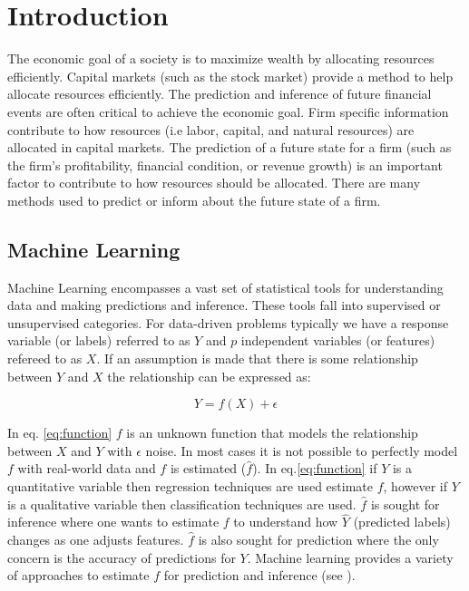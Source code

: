 \chapter{Introduction}


The economic goal of a society is to maximize wealth by allocating resources efficiently. Capital markets (such as the stock market) provide a method to help allocate resources efficiently. The prediction and inference of future financial events are often critical to achieve the economic goal. Firm specific information contribute to how resources (i.e labor, capital, and natural resources) are allocated in capital markets. The prediction of a future state for a firm (such as the firm's profitability, financial condition, or revenue growth) is an important factor to contribute to how resources should be allocated.  There are many methods used to predict or inform about the future state of a firm.  


\section{Machine Learning}

Machine Learning encompasses a vast set of statistical tools for understanding data and making predictions and inference. These tools fall into supervised or unsupervised categories. For data-driven problems typically we have a response variable (or labels)  referred to as \(Y\) and \(p\) independent variables (or features) refereed to as \(X\). If an assumption is made that there is some relationship between \(Y\) and \(X\) the relationship can be expressed as:

\begin{equation}
\label{eq:function}
Y = f(X) + \epsilon
\end{equation}

\noindent In eq. \ref{eq:function} \(f\) is an unknown function that models the relationship between \(X\) and \(Y\) with  \( \epsilon \) noise.  In most cases it is not possible to perfectly model \(f\) with real-world data and \(f\) is estimated (\(\hat{f}\)). In eq.\ref{eq:function} if \(Y\) is a quantitative variable then regression techniques are used estimate \(f\), however if \(Y\) is a qualitative variable then classification techniques are used.   \(\hat{f}\) is sought for inference where one wants to estimate \(f\) to understand how \(\hat{Y}\) (predicted labels) changes as one adjusts features. \(\hat{f}\) is also sought for prediction where the only concern is the accuracy of predictions for \(Y\). Machine learning provides a variety of approaches to estimate \(f\) for prediction and inference (see \cite{ISL:C1}).

